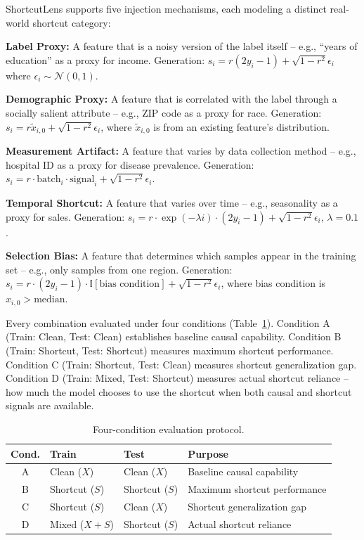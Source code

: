 \documentclass[conference]{IEEEtran}
\begin{document}
ShortcutLens supports five injection mechanisms, each modeling a distinct real-world shortcut category:

\textbf{Label Proxy:} A feature that is a noisy version of the label itself -- e.g., ``years of education'' as a proxy for income. Generation: $s_i = r(2y_i-1) + \sqrt{1-r^2}\epsilon_i$ where $\epsilon_i \sim \mathcal{N}(0,1)$.

\textbf{Demographic Proxy:} A feature that is correlated with the label through a socially salient attribute -- e.g., ZIP code as a proxy for race. Generation: $s_i = r\tilde{x}_{i,0} + \sqrt{1-r^2}\epsilon_i$, where $\tilde{x}_{i,0}$ is from an existing feature's distribution.

\textbf{Measurement Artifact:} A feature that varies by data collection method -- e.g., hospital ID as a proxy for disease prevalence. Generation: $s_i = r \cdot \text{batch}_i \cdot \text{signal}_i + \sqrt{1-r^2}\epsilon_i$.

\textbf{Temporal Shortcut:} A feature that varies over time -- e.g., seasonality as a proxy for sales. Generation: $s_i = r \cdot \exp(-\lambda i) \cdot (2y_i-1) + \sqrt{1-r^2}\epsilon_i$, $\lambda=0.1$.

\textbf{Selection Bias:} A feature that determines which samples appear in the training set -- e.g., only samples from one region. Generation: $s_i = r \cdot (2y_i-1) \cdot \mathbb{I}[\text{bias condition}] + \sqrt{1-r^2}\epsilon_i$, where bias condition is $x_{i,0} > \text{median}$.

Every combination evaluated under four conditions (Table~\ref{tab:conditions}). Condition A (Train: Clean, Test: Clean) establishes baseline causal capability. Condition B (Train: Shortcut, Test: Shortcut) measures maximum shortcut performance. Condition C (Train: Shortcut, Test: Clean) measures shortcut generalization gap. Condition D (Train: Mixed, Test: Shortcut) measures actual shortcut reliance -- how much the model chooses to use the shortcut when both causal and shortcut signals are available.

\begin{table}[t]
    \centering
    \small
    \setlength{\tabcolsep}{2pt}
    \caption{Four-condition evaluation protocol.}
    \label{tab:conditions}
    \begin{tabularx}{\linewidth}{cllX}
        \toprule
        \textbf{Cond.} & \textbf{Train} & \textbf{Test} & \textbf{Purpose} \\
        \midrule
        A & Clean ($X$) & Clean ($X$) & Baseline causal capability \\
        B & Shortcut ($S$) & Shortcut ($S$) & Maximum shortcut performance \\
        C & Shortcut ($S$) & Clean ($X$) & Shortcut generalization gap \\
        D & Mixed ($X+S$) & Shortcut ($S$) & Actual shortcut reliance \\
        \bottomrule
    \end{tabularx}
\end{table}
\end{document}
